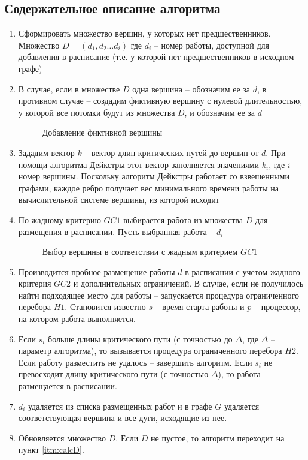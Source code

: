 \subsection{Содержательное описание алгоритма}
\begin{enumerate}
    \item Сформировать множество вершин, у которых нет предшественников. Множество $D = \left( d_1, d_2 \dots d_i \right)$ где $d_i$ – номер работы, доступной для добавления в расписание (т.е. у которой нет предшественников в исходном графе)
    \item В случае, если в множестве $D$ одна вершина – обозначим ее за $d$, в противном случае – создадим фиктивную вершину с нулевой длительностью, у которой все потомки будут из множества $D$, и обозначим ее за $d$
          \begin{figure}[H]
              \caption{Добавление фиктивной вершины}
          \end{figure}
    \item Зададим вектор $k$ – вектор длин критических путей до вершин от $d$. При помощи алгоритма Дейкстры этот вектор заполняется значениями $k_i$, где $i$ – номер вершины. Поскольку алгоритм Дейкстры работает со взвешенными графами, каждое ребро получает вес минимального времени работы на вычислительной системе вершины, из которой исходит
    \item \label{itm:calcD} По жадному критерию $GC1$ выбирается работа из множества $D$ для размещения в расписании. Пусть выбранная работа – $d_i$
          \begin{figure}[H]
              \caption{Выбор вершины в соответствии с жадным критерием $GC1$}
          \end{figure}
    \item Производится пробное размещение работы $d$ в расписании с учетом жадного критерия $GC2$ и дополнительных ограничений. В случае, если не получилось найти подходящее место для работы – запускается процедура ограниченного перебора $H1$. Становится известно $s$ – время старта работы и $p$ – процессор, на котором работа выполняется.
    \item Если $s_i$ больше длины критического пути (с точностью до $\Delta$, где $\Delta$ – параметр алгоритма), то вызывается процедура ограниченного перебора $H2$. Если работу разместить не удалось – завершить алгоритм. Если $s_i$ не превосходит длину критического пути (с точностью $\Delta$), то работа размещается в расписании.
    \item $d_i$ удаляется из списка размещенных работ и в графе $G$ удаляется соответствующая вершина и все дуги, исходящие из нее.
    \item Обновляется множество $D$. Если $D$ не пустое, то алгоритм переходит на пункт \ref{itm:calcD}.
\end{enumerate}
